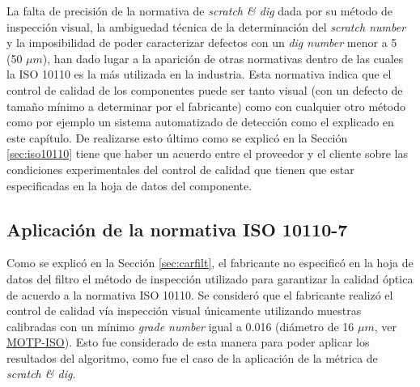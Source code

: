  La falta de precisión de la normativa de \textit{scratch \& dig} dada por su método de inspección visual, la ambiguedad técnica de la determinación del \textit{scratch number} y la imposibilidad de poder caracterizar defectos con un \textit{dig number} menor a 5 (50 $\mu m$), han dado lugar a la aparición de otras normativas dentro de las cuales la ISO 10110 es la más utilizada en la industria. Esta normativa indica que el control de calidad de los componentes puede ser tanto visual (con un defecto de tamaño mínimo a determinar por el fabricante) como con cualquier otro método como por ejemplo un sistema automatizado de detección como el explicado en este capítulo. De realizarse esto último como se explicó en la Sección \ref{sec:iso10110} tiene que haber un acuerdo entre el proveedor y el cliente sobre las condiciones experimentales del control de calidad que tienen que estar especificadas en la hoja de datos del componente.
 

\singlespacing
\subsection{Aplicación de la normativa ISO 10110-7}
\label{sec:apiso}

\hspace{0.5cm}Como se explicó en la Sección \ref{sec:carfilt}, el fabricante no especificó en la hoja de datos del filtro el método de inspección utilizado para garantizar la calidad óptica de acuerdo a la normativa ISO 10110. Se consideró que el fabricante realizó el control de calidad vía inspección visual únicamente utilizando muestras calibradas con un mínimo \textit{grade number} igual a 0.016 (diámetro de 16 $\mu m$, ver \href{https://www.thorlabs.com/thorproduct.cfm?partnumber=MOTP-ISO}{MOTP-ISO}). Esto fue considerado de esta manera para poder aplicar los resultados del algoritmo, como fue el caso de la aplicación de la métrica de \textit{scratch \& dig}.

